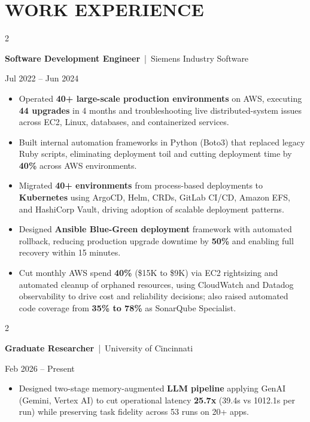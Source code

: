 \documentclass[10pt, letterpaper]{article}
\newenvironment{highlights}{
    \begin{itemize}[
        topsep=0.10 cm,
        parsep=0.06 cm,
        partopsep=0pt,
        itemsep=0.06 cm,
        leftmargin=12pt
    ]
}{
    \end{itemize}
}
\newenvironment{twocolentry}[2][]{
    \onecolentry
    \def\secondColumn{#2}
    \setcolumnwidth{\fill, 4.5 cm}
    \begin{paracol}{2}
}{
    \switchcolumn \raggedleft \secondColumn
    \end{paracol}
    \endonecolentry
}
\begin{document}
\section{WORK EXPERIENCE}
\begin{twocolentry}{Jul 2022 -- Jun 2024}
\textbf{Software Development Engineer} \,|\, Siemens Industry Software
\end{twocolentry}
\begin{highlights}
  \item Operated \textbf{40+ large-scale production environments} on AWS, executing \textbf{44 upgrades} in 4 months and troubleshooting live distributed-system issues across EC2, Linux, databases, and containerized services.
  \item Built internal automation frameworks in Python (Boto3) that replaced legacy Ruby scripts, eliminating deployment toil and cutting deployment time by \textbf{40\%} across AWS environments.
  \item Migrated \textbf{40+ environments} from process-based deployments to \textbf{Kubernetes} using ArgoCD, Helm, CRDs, GitLab CI/CD, Amazon EFS, and HashiCorp Vault, driving adoption of scalable deployment patterns.
  \item Designed \textbf{Ansible Blue-Green deployment} framework with automated rollback, reducing production upgrade downtime by \textbf{50\%} and enabling full recovery within 15 minutes.
  \item Cut monthly AWS spend \textbf{40\%} (\$15K to \$9K) via EC2 rightsizing and automated cleanup of orphaned resources, using CloudWatch and Datadog observability to drive cost and reliability decisions; also raised automated code coverage from \textbf{35\% to 78\%} as SonarQube Specialist.
\end{highlights}

\vspace{0.15 cm}

\begin{twocolentry}{Feb 2026 -- Present}
\textbf{Graduate Researcher} \,|\, University of Cincinnati
\end{twocolentry}
\begin{highlights}
  \item Designed two-stage memory-augmented \textbf{LLM pipeline} applying GenAI (Gemini, Vertex AI) to cut operational latency \textbf{25.7x} (39.4s vs 1012.1s per run) while preserving task fidelity across 53 runs on 20+ apps.
\end{highlights}
\end{document}
